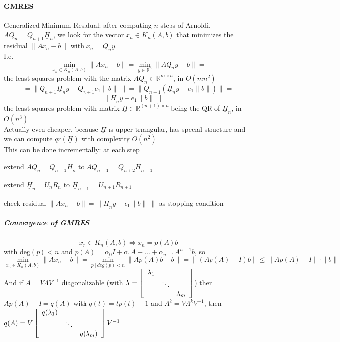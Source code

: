 \documentclass[10pt]{report}
\begin{document}
\paragraph{GMRES} Generalized Minimum Residual: after computing $n$ steps of Arnoldi, $AQ_n = Q_{n+1}\underline{H}_n$, we look for the vector $x_n\in K_n(A,b)$ that minimizes the residual $\|Ax_n-b\|$ with $x_n = Q_ny$.\\
I.e. $$\min_{x_n\in K_n(A,b)}\|Ax_n-b\| = \min_{y\in \mathbb{R}^n} \|AQ_ny -b\|=$$ the least squares problem with the matrix $AQ_n\in \mathbb{R}^{m\times n}$, in $O(mn^2)$
$$=\|Q_{n+1}\underline{H}_ny-Q_{n+1}e_1\|b\|\:\|=\|Q_{n+1}\left(\underline{H}_ny-e_1\|b\|\right)\|=$$
$$= \|\underline{H}_n y - e_1\|b\|\,\|$$ the least squares problem with matrix $\underline{H}\in \mathbb{R}^{(n+1)\times n}$ being the QR of $\underline{H}_n$, in $O(n^3)$\\
Actually even cheaper, because $\underline{H}$ is upper triangular, has special structure and we can compute $qr(\underline{H})$ with complexity $O(n^2)$\\
This can be done incrementally: at each step
\begin{list}{}{}
	\item extend $AQ_n=Q_{n+1}\underline{H}_n$ to $AQ_{n+1} = Q_{n+2}\underline{H}_{n+1}$
	\item extend $\underline{H}_n = U_nR_n$ to $\underline{H}_{n+1}=U_{n+1}R_{n+1}$
	\item check residual $\|Ax_n-b\|=\|\underline{H}_ny-e_1\|b\|\:\|$ as stopping condition
\end{list}
\subparagraph{Convergence of GMRES} $$x_n\in K_n(A,b)\Leftrightarrow x_n = p(A)b$$ with $\text{deg}(p)<n$ and $p(A) = \alpha_0 I + \alpha_1 A + \ldots + \alpha_{n-1}A^{n-1}b$, so
$$\min_{x_n\in K_n(A,b)} \|Ax_n-b\| = \min_{p\:|\:deg(p)<n}\|Ap(A)b - b\| = \|(Ap(A)-I)b\| \leq \|Ap(A)-I\|\cdot\|b\|$$
And if $A = V\Lambda V^{-1}$ diagonalizable (with $\Lambda = \left[\begin{array}{c c c}
\lambda_1\\
& \ddots\\
& & \lambda_m
\end{array}\right]$) then $Ap(A)-I = q(A)$ with $q(t) = tp(t)-1$ and $A^k = V\Lambda^kV^{-1}$, then $q(A) = V\left[\begin{array}{c c c}
q(\lambda_1)\\
& \ddots\\
& & q(\lambda_m)
\end{array}\right] V^{-1}$\\
\end{document}
